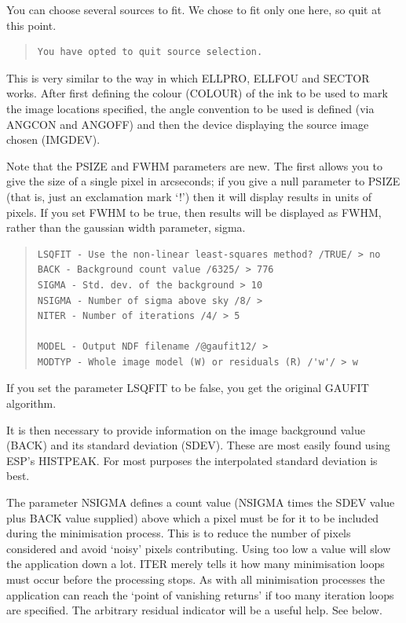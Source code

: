 \documentclass[twoside,11pt]{article}
\newenvironment{myquote}{\begin{quote}\begin{small}}{\end{small}\end{quote}}
\begin{document}
You can choose several sources to fit.  We chose to fit only one here,
so quit at this point.

\begin{myquote}
\begin{verbatim}
You have opted to quit source selection.
\end{verbatim}
\end{myquote}

This is very similar to the way in which ELLPRO, ELLFOU and SECTOR works. 
After first defining the colour (COLOUR) of the ink to be used to mark the 
image locations specified, the angle convention to be used is 
defined (via ANGCON and ANGOFF) and then the device displaying the 
source image chosen (IMGDEV).

Note that the PSIZE and FWHM parameters are new.  The first allows
you to give the size of a single pixel in arcseconds; if you give a
null parameter to PSIZE (that is, just an exclamation mark `!') then
it will display results in units of pixels.  If you set FWHM to be
true, then results will be displayed as FWHM, rather than the gaussian
width parameter, sigma.

\begin{myquote}
\begin{verbatim}
LSQFIT - Use the non-linear least-squares method? /TRUE/ > no
BACK - Background count value /6325/ > 776
SIGMA - Std. dev. of the background > 10
NSIGMA - Number of sigma above sky /8/ >             
NITER - Number of iterations /4/ > 5
  
MODEL - Output NDF filename /@gaufit12/ > 
MODTYP - Whole image model (W) or residuals (R) /'w'/ > w
\end{verbatim}
\end{myquote}

If you set the parameter LSQFIT to be false, you get the original
GAUFIT algorithm.

It is then necessary to provide information on the image background value
(BACK) and its standard deviation (SDEV). These are most easily found 
using ESP's HISTPEAK. For most purposes the interpolated standard deviation is
best.

The parameter NSIGMA defines a count value (NSIGMA times the SDEV value 
plus BACK value supplied)
above which a pixel must be
for it to be included during the minimisation process. This is to reduce
the number of pixels considered and avoid `noisy' pixels contributing. 
Using too low a value will slow the application down a lot. 
ITER merely tells it how many minimisation loops must occur before the 
processing stops. As with all minimisation processes the application can 
reach the `point of vanishing returns' if too many iteration loops are 
specified. The arbitrary residual indicator will be a useful help. See below.
\end{document}
